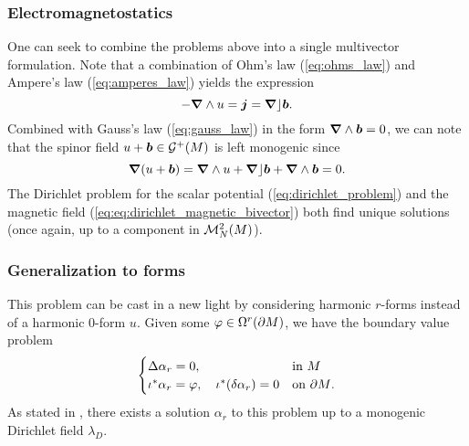 \subsubsection{Electromagnetostatics}

One can seek to combine the problems above into a single multivector formulation. Note that a combination of Ohm's law (\cref{eq:ohms_law}) and Ampere's law (\cref{eq:amperes_law}) yields the expression
\begin{equation}
-\boldsymbol{\nabla} \wedge u = \boldsymbol{j} = \boldsymbol{\nabla} \rfloor \boldsymbol{b}.
\end{equation}
Combined with Gauss's law (\cref{eq:gauss_law}) in the form $\boldsymbol{\nabla} \wedge \boldsymbol{b}=0$, we can note that the spinor field $u+\boldsymbol{b} \in \mathcal{G}^+(M)$ is left monogenic since
\begin{equation}
\boldsymbol{\nabla}(u+\boldsymbol{b}) =  \boldsymbol{\nabla} \wedge u + \boldsymbol{\nabla} \rfloor \boldsymbol{b} + \boldsymbol{\nabla} \wedge \boldsymbol{b} = 0.
\end{equation}
The Dirichlet problem for the scalar potential (\cref{eq:dirichlet_problem}) and the magnetic field (\cref{eq:eq:dirichlet_magnetic_bivector}) both find unique solutions (once again, up to a component in $\mathcal{M}^{2}_N(M)$). 



\subsubsection{Generalization to forms}

This problem can be cast in a new light by considering harmonic $r$-forms instead of a harmonic 0-form $u$. 
Given some $\varphi \in \Omega^r({\partial M})$, we have the boundary value problem
\begin{equation}
\label{eq:bvp_forms}
\begin{cases} 
\Delta \alpha_r = 0, & \textrm{in $M$}\\
\iota^* \alpha_r = \varphi, \quad \iota^*(\delta \alpha_r) = 0 & \textrm{on ${\partial M}$}.
\end{cases}
\end{equation}
As stated in \cite{belishev_dirichlet_2008}, there exists a solution $\alpha_r$ to this problem up to a monogenic Dirichlet field $\lambda_D$.


